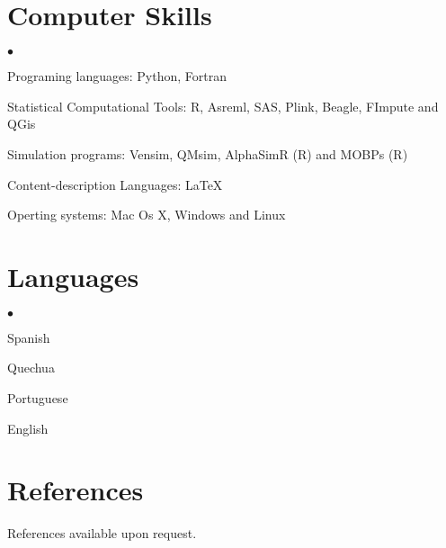 \documentclass[margin,line,10pt]{res}
\newenvironment{list2}{
  \begin{list}{$\bullet$}{%
      \setlength{\itemsep}{0in}
      \setlength{\parsep}{0in} \setlength{\parskip}{0in}
      \setlength{\topsep}{0in} \setlength{\partopsep}{0in} 
      \setlength{\leftmargin}{0.2in}}}{\end{list}}
\begin{document}
\begin{resume}
\section{\sc Computer Skills} 
\begin{list2}
\item Programing languages: Python, Fortran
\vspace{0.3cm}
\item Statistical Computational Tools: R, Asreml, SAS, Plink, Beagle, FImpute and QGis
\vspace{0.3cm}
\item Simulation programs: Vensim, QMsim, AlphaSimR (R) and MOBPs (R)
\vspace{0.3cm}
\item Content-description Languages: \LaTeX
\vspace{0.3cm}
\item Operting systems: Mac Os X, Windows and Linux  
\end{list2}

\section{\sc Languages} 
\begin{list2}
\vspace{0.3cm}
\item Spanish
\vspace{0.3cm}
\item Quechua
\vspace{0.3cm}
\item Portuguese
\vspace{0.3cm}
\item English
\end{list2}

\section{\sc References}
References available upon request. 

\end{resume}
\end{document}
